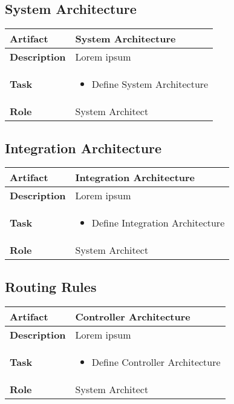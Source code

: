 \subsection{System Architecture}
\begin{minipage}{\textwidth}
 \label{table:ch6_Artifact_System_Architecture}
\begin{tabular}
	{|m{2cm}|m{10cm}|} \hline \bfseries Artifact & System Architecture\\
	\hline \bfseries Description & Lorem ipsum\\
	\hline \bfseries Task & 
	\begin{itemize}
		\item Define System Architecture 
	\end{itemize}
	\\
	\hline \bfseries Role & System Architect\\
	\hline 
\end{tabular}
\end{minipage}

\subsection{Integration Architecture}
\begin{minipage}{\textwidth}
 \label{table:ch6_Artifact_Integration_Architecture}
\begin{tabular}
	{|m{2cm}|m{10cm}|} \hline \bfseries Artifact & Integration Architecture\\
	\hline \bfseries Description & Lorem ipsum\\
	\hline \bfseries Task & 
	\begin{itemize}
		\item Define Integration Architecture 
	\end{itemize}
	\\
	\hline \bfseries Role & System Architect\\
	\hline 
\end{tabular}
\end{minipage}

\subsection{Routing Rules}
\begin{minipage}{\textwidth}
 \label{table:ch6_Artifact_Routing_Rules}
\begin{tabular}
	{|m{2cm}|m{10cm}|} \hline \bfseries Artifact & Controller Architecture\\
	\hline \bfseries Description & Lorem ipsum\\
	\hline \bfseries Task & 
	\begin{itemize}
		\item Define Controller Architecture 
	\end{itemize}
	\\
	\hline \bfseries Role & System Architect\\
	\hline 
\end{tabular}
\end{minipage}

